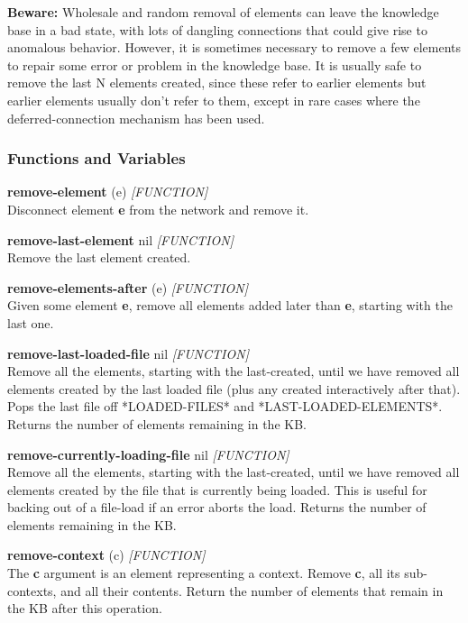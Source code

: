 \documentclass[titlepage,twoside,openright,11pt]{article}
\begin{document}
\textbf{Beware:} Wholesale and random removal of elements can leave the
knowledge base in a bad state, with lots of dangling connections that
could give rise to anomalous behavior. However, it is sometimes
necessary to remove a few elements to repair some error or problem in
the knowledge base. It is usually safe to remove the last N elements
created, since these refer to earlier elements but earlier elements
usually don't refer to them, except in rare cases where the
deferred-connection mechanism has been used.

\subsubsection{Functions and Variables}\label{functions-and-variables-6}

\textbf{remove-element} (e) \emph{{[}FUNCTION{]}}\\
Disconnect element \textbf{e} from the network and remove it.

\textbf{remove-last-element} nil \emph{{[}FUNCTION{]}}\\
Remove the last element created.

\textbf{remove-elements-after} (e) \emph{{[}FUNCTION{]}}\\
Given some element \textbf{e}, remove all elements added later than
\textbf{e}, starting with the last one.

\textbf{remove-last-loaded-file} nil \emph{{[}FUNCTION{]}}\\
Remove all the elements, starting with the last-created, until we have
removed all elements created by the last loaded file (plus any created
interactively after that). Pops the last file off *LOADED-FILES* and
*LAST-LOADED-ELEMENTS*. Returns the number of elements remaining in the
KB.

\textbf{remove-currently-loading-file} nil \emph{{[}FUNCTION{]}}\\
Remove all the elements, starting with the last-created, until we have
removed all elements created by the file that is currently being loaded.
This is useful for backing out of a file-load if an error aborts the
load. Returns the number of elements remaining in the KB.

\textbf{remove-context} (c) \emph{{[}FUNCTION{]}}\\
The \textbf{c} argument is an element representing a context. Remove
\textbf{c}, all its sub-contexts, and all their contents. Return the
number of elements that remain in the KB after this operation.
\end{document}
